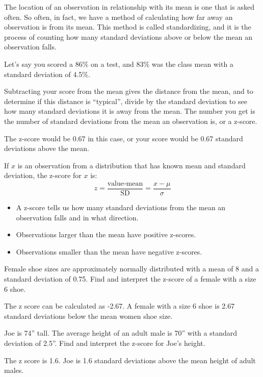 \documentclass[../stats.tex]{subfiles}
\begin{document}
The location of an observation in relationship with its mean is one that is asked often. So often, in fact, we have a method of calculating how far away an observation is from its mean.
This method is called standardizing, and it is the process of counting how many standard deviations above or below the mean an observation falls.

Let's say you scored a 86\% on a test, and 83\% was the class mean with a standard deviation of 4.5\%.

Subtracting your score from the mean gives the distance from the mean, and to determine if this distance is ``typical'', divide by the standard deviation to see how many standard deviations it is away from the mean. The number you get is the number of standard deviations from the mean an observation is, or a z-score.

The z-score would be 0.67 in this case, or your score would be 0.67 standard deviations above the mean.

If $x$ is an observation from a distribution that has known mean and standard deviation, the z-score for $x$ is:
\[ z=\frac{\text{value-mean}}{\text{SD}}=\frac{x-\mu}{\sigma} \]
\begin{itemize}
    \item A z-score tells us how many standard deviations from the mean an observation falls and in what direction.
    \item Observations larger than the mean have positive z-scores.
    \item Observations smaller than the mean have negative z-scores.
\end{itemize}

\begin{example}
    Female shoe sizes are approximately normally distributed with a mean of 8 and a standard deviation of 0.75. Find and interpret the z-score of a female with a size 6 shoe.

    The z score can be calculated as -2.67. A female with a size 6 shoe is 2.67 standard deviations below the mean women shoe size.
\end{example}

\begin{example}
    Joe is 74'' tall. The average height of an adult male is 70'' with a standard deviation of 2.5''. Find and interpret the z-score for Joe's height.

    The z score is 1.6. Joe is 1.6 standard deviations above the mean height of adult males.
\end{example}
\end{document}
